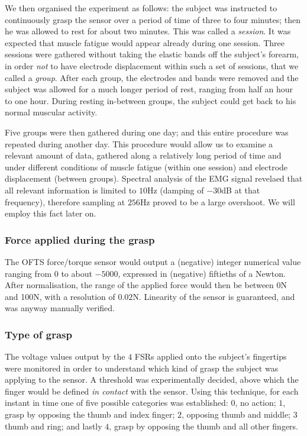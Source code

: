 We then organised the experiment as follows: the subject was
instructed to continuously grasp the sensor over a period of time of
three to four minutes; then he was allowed to rest for about two
minutes. This was called a \emph{session}. It was expected that muscle
fatigue would appear already during one session. Three sessions were
gathered without taking the elastic bands off the subject's forearm,
in order \emph{not} to have electrode displacement within such a set
of sessions, that we called a \emph{group}. After each group, the
electrodes and bands were removed and the subject was allowed for a
much longer period of rest, ranging from half an hour to one
hour. During resting in-between groups, the subject could get back to
his normal muscular activity.

Five groups were then gathered during one day; and this entire
procedure was repeated during another day. This procedure would allow
us to examine a relevant amount of data, gathered along a relatively
long period of time and under different conditions of muscle fatigue
(within one session) and electrode displacement (between
groups). Spectral analysis of the EMG signal revelaed that all
relevant information is limited to $10$Hz (damping of $-30$dB at that
frequency), therefore sampling at $256$Hz proved to be a large
overshoot. We will employ this fact later on.

\subsubsection{Force applied during the grasp}

The OFTS force/torque sensor would output a (negative) integer
numerical value ranging from $0$ to about $-5000$, expressed in
(negative) fiftieths of a Newton. After normalisation, the range of
the applied force would then be between 0N and 100N, with a
resolution of $0.02$N. Linearity of the sensor is guaranteed, and was
anyway manually verified.

\subsubsection{Type of grasp}

The voltage values output by the $4$ FSRs applied onto the subject's
fingertips were monitored in order to understand which kind of grasp
the subject was applying to the sensor. A threshold was experimentally
decided, above which the finger would be defined \emph{in contact}
with the sensor. Using this technique, for each instant in time one of
five possible categories was established: $0$, no action; $1$, grasp
by opposing the thumb and index finger; $2$, opposing thumb and
middle; $3$ thumb and ring; and lastly $4$, grasp by opposing the
thumb and all other fingers.

